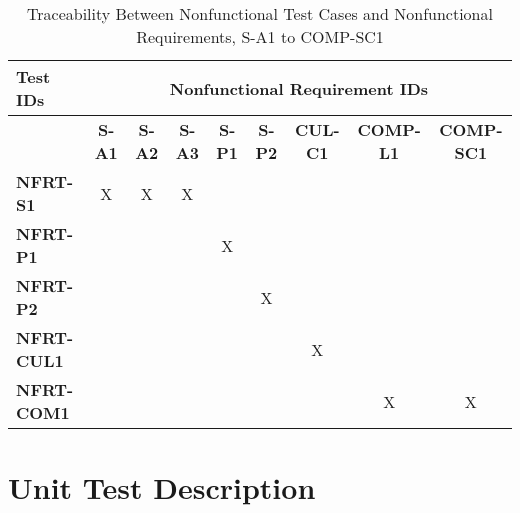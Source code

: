 \documentclass[12pt, titlepage]{article}
\begin{document}
\begin{landscape}
	\newpage
	
			\begin{longtable}{|l|cccccccc|}
	\caption{Traceability Between Nonfunctional Test Cases and Nonfunctional Requirements, S-A1 to COMP-SC1}                                                                                                                                                                                                                           \\
		\hline
		\textbf{Test IDs}   & \multicolumn{8}{c|}{\textbf{Nonfunctional Requirement IDs}}                                                                                                                                                                                                                 \\
		\hline
		~                   & \textbf{S-A1} & \textbf{S-A2} & \textbf{S-A3} & \textbf{S-P1} & \textbf{S-P2} & \textbf{CUL-C1} & \textbf{COMP-L1} & \textbf{COMP-SC1}\\
		\hline
		\textbf{NFRT-S1} & X                                                         & X             & X             & ~             & ~             & ~             & ~             & ~\\
		\textbf{NFRT-P1} & ~                                                         & ~             & ~             & X             & ~             & ~             & ~             & ~\\
		\textbf{NFRT-P2} & ~                                                         & ~             & ~             & ~             & X             & ~             & ~             & ~\\
		\textbf{NFRT-CUL1} & ~                                                         & ~             & ~             & ~             & ~             & X             & ~             & ~\\
		\textbf{NFRT-COM1} & ~                                                         & ~             & ~             & ~             & ~             & ~             & X             & X\\
		\hline
	\end{longtable}

	\newpage
\end{landscape}

\section{Unit Test Description}
\label{sec:unit}
\end{document}
